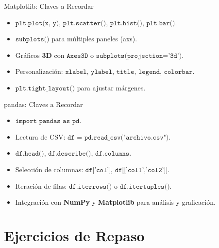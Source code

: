 \documentclass[10pt]{beamer}
\begin{document}
\begin{frame}{Matplotlib: Claves a Recordar}
  \begin{itemize}
    \item \(\texttt{plt.plot(x, y)}\), \(\texttt{plt.scatter()}\), \(\texttt{plt.hist()}\), \(\texttt{plt.bar()}\).
    \item \(\texttt{subplots()}\) para múltiples paneles (axs).
    \item Gráficos \textbf{3D} con \(\texttt{Axes3D}\) o \(\texttt{subplots(projection='3d')}\).
    \item Personalización: \(\texttt{xlabel, ylabel, title, legend, colorbar}\).
    \item \(\texttt{plt.tight\_layout()}\) para ajustar márgenes.
  \end{itemize}
\end{frame}

\begin{frame}{pandas: Claves a Recordar}
  \begin{itemize}
    \item \(\texttt{import pandas as pd}\).
    \item Lectura de CSV: \(\texttt{df = pd.read\_csv("archivo.csv")}\).
    \item \(\texttt{df.head()}\), \(\texttt{df.describe()}\), \(\texttt{df.columns}\).
    \item Selección de columnas: \(\texttt{df['col']}\), \(\texttt{df[['col1','col2']]}\).
    \item Iteración de filas: \(\texttt{df.iterrows()}\) o \(\texttt{df.itertuples()}\).
    \item Integración con \textbf{NumPy} y \textbf{Matplotlib} para análisis y graficación.
  \end{itemize}
\end{frame}

\section{Ejercicios de Repaso}
\end{document}
